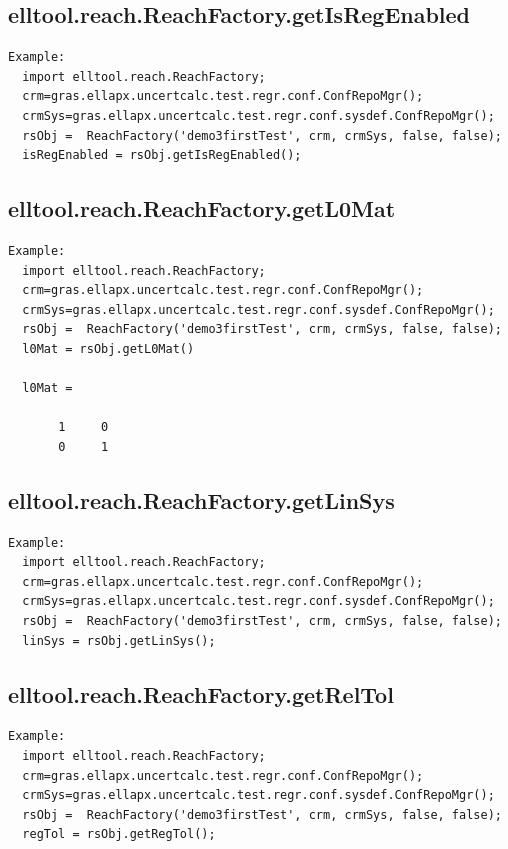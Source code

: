 \documentclass[letterpaper,10pt,english]{sphinxmanual}
\begin{document}
\subsection{elltool.reach.ReachFactory.getIsRegEnabled}
\label{chap_functions:elltool-reach-reachfactory-getisregenabled}
\begin{Verbatim}[commandchars=\\\{\}]
Example:
  import elltool.reach.ReachFactory;
  crm=gras.ellapx.uncertcalc.test.regr.conf.ConfRepoMgr();
  crmSys=gras.ellapx.uncertcalc.test.regr.conf.sysdef.ConfRepoMgr();
  rsObj =  ReachFactory('demo3firstTest', crm, crmSys, false, false);
  isRegEnabled = rsObj.getIsRegEnabled();
\end{Verbatim}


\subsection{elltool.reach.ReachFactory.getL0Mat}
\label{chap_functions:elltool-reach-reachfactory-getl0mat}
\begin{Verbatim}[commandchars=\\\{\}]
Example:
  import elltool.reach.ReachFactory;
  crm=gras.ellapx.uncertcalc.test.regr.conf.ConfRepoMgr();
  crmSys=gras.ellapx.uncertcalc.test.regr.conf.sysdef.ConfRepoMgr();
  rsObj =  ReachFactory('demo3firstTest', crm, crmSys, false, false);
  l0Mat = rsObj.getL0Mat()

  l0Mat =

       1     0
       0     1
\end{Verbatim}


\subsection{elltool.reach.ReachFactory.getLinSys}
\label{chap_functions:elltool-reach-reachfactory-getlinsys}
\begin{Verbatim}[commandchars=\\\{\}]
Example:
  import elltool.reach.ReachFactory;
  crm=gras.ellapx.uncertcalc.test.regr.conf.ConfRepoMgr();
  crmSys=gras.ellapx.uncertcalc.test.regr.conf.sysdef.ConfRepoMgr();
  rsObj =  ReachFactory('demo3firstTest', crm, crmSys, false, false);
  linSys = rsObj.getLinSys();
\end{Verbatim}


\subsection{elltool.reach.ReachFactory.getRelTol}
\label{chap_functions:elltool-reach-reachfactory-getreltol}
\begin{Verbatim}[commandchars=\\\{\}]
Example:
  import elltool.reach.ReachFactory;
  crm=gras.ellapx.uncertcalc.test.regr.conf.ConfRepoMgr();
  crmSys=gras.ellapx.uncertcalc.test.regr.conf.sysdef.ConfRepoMgr();
  rsObj =  ReachFactory('demo3firstTest', crm, crmSys, false, false);
  regTol = rsObj.getRegTol();
\end{Verbatim}
\end{document}

